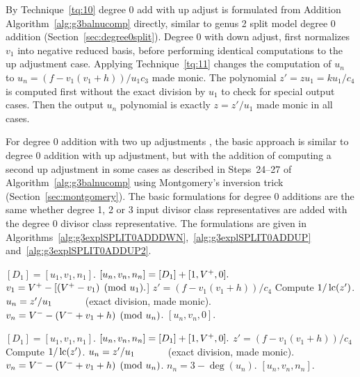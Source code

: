 By Technique~\ref{tq:10} degree 0 add with up adjust is formulated from Addition
Algorithm~\ref{alg:g3balnucomp} directly, similar to genus 2 split model degree
0 addition (Section~\ref{sec:degree0split}). Degree 0 with down adjust, first
normalizes $v_1$ into negative reduced basis, before performing identical
computations to the up adjustment case. Applying Technique~\ref{tq:11} changes
the computation of $u_n$ to $u_n = (f - v_1(v_1 + h))/u_1c_3$ made monic. The
polynomial $z' = zu_1 = ku_1/c_4$ is computed first without the exact division
by $u_1$ to check for special output cases. Then the output $u_n$ polynomial is
exactly $z = z'/u_1$ made monic in all cases.

For degree 0 addition with two up adjustments , the basic approach is similar to
degree 0 addition with up adjustment, but with the addition of computing a
second up adjustment in some cases as described in Steps~24--27 of
Algorithm~\ref{alg:g3balnucomp} using Montgomery's inversion trick
(Section~\ref{sec:montgomery}). The basic formulations for degree 0 additions
are the same whether degree 1, 2 or 3 input divisor class representatives are
added with the degree 0 divisor class representative. The formulations are given in
Algorithms~\ref{alg:g3explSPLIT0ADDDWN},~\ref{alg:g3explSPLIT0ADDUP}
and~\ref{alg:g3explSPLIT0ADDUP2}.

\begin{algorithm}[H]
\caption{Genus 3 Split Model Degree 0 Add with Down Adjust\label{alg:g3explSPLIT0ADDDWN}}
\begin{algorithmic} [1]
\Require $[D_1] = [u_1, v_1, n_1]$. \smallskip
\Ensure $[u_n,v_n,n_n] = [D_1] + [1,V^{+},0].$
\algrule
\State $v_1 =  V^{+} - [(V^{+} - v_1) \pmod{u_1}.$]
\State $z' = (f - v_1(v_1 + h))/c_4$
\State Compute $1/\operatorname{lc}(z')$.
\State $u_n = z'/u_1 \quad\quad\quad$ (exact division, made monic).
\State $v_n = V^{-} - (V^{-} + v_1 + h) \pmod{u_n}$.
\State \Return $[u_n,v_n,0]$.
\end{algorithmic}
\end{algorithm}

\begin{algorithm}[H]
\caption{Genus 3 Split Model Degree 0 Add with Up Adjust\label{alg:g3explSPLIT0ADDUP}}
\begin{algorithmic} [1]
\Require $[D_1] = [u_1, v_1, n_1]$. \smallskip
\Ensure $[u_n,v_n,n_n] = [D_1] + [1,V^{+},0].$
\algrule
\State $z' = (f - v_1(v_1 + h))/c_4$
\State Compute $1/\operatorname{lc}(z')$.
\State $u_n = z'/u_1 \quad\quad\quad$ (exact division, made monic).
\State $v_n = V^{-} - (V^{-} + v_1 + h) \pmod{u_n}$.
\State $n_n = 3 - \deg(u_n)$.
\State \Return $[u_n,v_n,n_n]$.
\end{algorithmic}
\end{algorithm}

